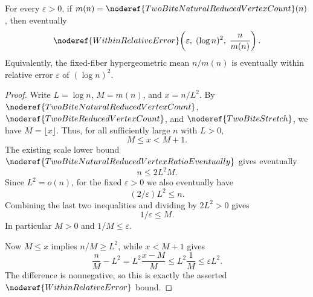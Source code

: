 \begin{helper}
For every \(\varepsilon>0\), if
\(m(n)=\noderef{TwoBiteNaturalReducedVertexCount}(n)\), then eventually
\[
  \noderef{WithinRelativeError}\!\left(
    \varepsilon,\;(\log n)^2,\;\frac{n}{m(n)}
  \right).
\]
Equivalently, the fixed-fiber hypergeometric mean \(n/m(n)\) is eventually
within relative error \(\varepsilon\) of \((\log n)^2\).
\end{helper}
\begin{proof}
Write \(L=\log n\), \(M=m(n)\), and
\(x=n/L^2\).  By \(\noderef{TwoBiteNaturalReducedVertexCount}\),
\(\noderef{TwoBiteReducedVertexCount}\), and \(\noderef{TwoBiteStretch}\),
we have \(M=\lfloor x\rfloor\).  Thus, for all sufficiently large \(n\) with
\(L>0\),
\[
  M\le x<M+1 .
\]
The existing scale lower bound
\(\noderef{TwoBiteNaturalReducedVertexRatioEventually}\) gives eventually
\[
  n\le 2L^2M .
\]
Since \(L^2=o(n)\), for the fixed \(\varepsilon>0\) we also eventually have
\[
  (2/\varepsilon)L^2\le n .
\]
Combining the last two inequalities and dividing by \(2L^2>0\) gives
\[
  1/\varepsilon\le M .
\]
In particular \(M>0\) and \(1/M\le\varepsilon\).

Now \(M\le x\) implies \(n/M\ge L^2\), while \(x<M+1\) gives
\[
  \frac{n}{M}-L^2
  =
  L^2\frac{x-M}{M}
  \le L^2\frac{1}{M}
  \le \varepsilon L^2 .
\]
The difference is nonnegative, so this is exactly the asserted
\(\noderef{WithinRelativeError}\) bound.
\end{proof}
